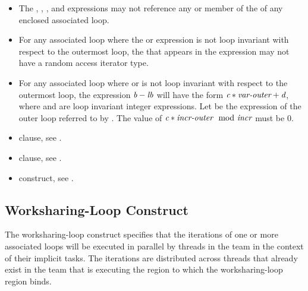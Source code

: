 \begin{itemize}
\item The , , , and  expressions
      may not reference any  or member of the  of
      any enclosed associated loop.
\item For any associated loop where the  or  expression is not loop
      invariant with respect to the outermost loop, the  that
      appears in the expression may not have a random access iterator type.
\item For any associated loop where  or  is not loop invariant
      with respect to the outermost loop, the expression $\plc{b}-\plc{lb}$
      will have the form $\plc{c}*\plc{var-outer}+\plc{d}$, where  and
       are loop invariant integer expressions. Let  be
      the  expression of the outer loop referred to by .  
      The value of $\plc{c}*\plc{incr-outer} \mod \plc{incr}$ must be 0.
\end{itemize}

\crossreferences
\begin{itemize}
\item {} clause, see .

\item {} clause, see .

\item {} construct, see .
\end{itemize}



\subsection{Worksharing-Loop Construct}
\label{subsec:Worksharing-Loop Construct}
\summary
The worksharing-loop construct specifies that the iterations of one or more 
associated loops will be executed in parallel by threads in the team in the 
context of their implicit tasks. The iterations are distributed across threads 
that already exist in the team that is executing the  region 
to which the worksharing-loop region binds.


